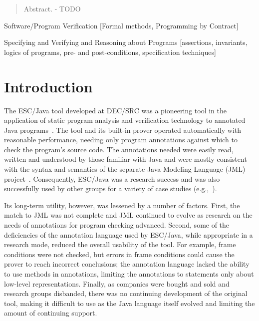 \documentclass{acm_proc_article-sp}
\newif\ifpdf
\begin{document}
\newcommand{\myhref}[2]{\ifpdf\href{#1}{#2}\else\htmladdnormallinkfoot{#2}{#1}\fi}

\maketitle
\begin{abstract}
Abstract. - TODO
\end{abstract}

                {Software/Program Verification}
                [Formal methods, Programming by Contract]

                {Specifying and Verifying and Reasoning about Programs}
                [assertions, invariants, logics of programs,
                pre- and post-conditions, specification techniques]




\section{Introduction}

The ESC/Java tool developed at DEC/SRC was a pioneering tool in the
application of static program analysis and verification technology to
annotated Java programs~\cite{ESCJava}.  The tool and its built-in
prover operated automatically with reasonable performance, needing
only program annotations against which to check the program's source
code.  The annotations needed were easily read, written and understood
by those familiar with Java and were mostly consistent with the syntax
and semantics of the separate Java Modeling Language (JML)
project~\cite{Leavens-etal00,jmlpapers}.  Consequently, ESC/Java was a
research success and was also successfully used by other groups for a
variety of case studies (e.g.,~\cite{Hub03,HOP04}).

Its long-term utility, however, was lessened by a number of factors.
First, the match to JML was not complete and JML continued to evolve
as research on the needs of annotations for program checking advanced.
Second, some of the deficiencies of the annotation language used by
ESC/Java, while appropriate in a research mode, reduced the overall
usability of the tool.  For example, frame conditions were not
checked, but errors in frame conditions could cause the prover to
reach incorrect conclusions; the annotation language lacked the
ability to use methods in annotations, limiting the annotations to
statements only about low-level representations.  Finally, as
companies were bought and sold and research groups disbanded, there
was no continuing development of the original tool, making it
difficult to use as the Java language itself evolved and limiting the
amount of continuing support.
\end{document}
